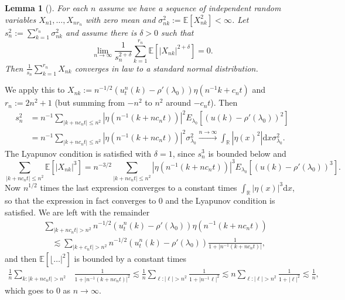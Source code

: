 \documentclass[11pt, a4paper]{article}
\newcommand{\assign}{:=}
\newcommand{\mathd}{\mathrm{d}}
\newcommand{\nocomma}{}
\newtheorem{lemma}[theorem]{Lemma}
\newcommand{\R}{\mathbb{R}}
\newcommand{\1}{\mathbf{1}}
\begin{document}
\begin{lemma}[{\cite[Theorem 27.3]{bib:billingsley}}]
  For each $n$ assume we have a sequence of independent random variables $X_{n
  1}, \ldots, X_{n r_n}$ with zero mean and $\sigma^2_{n k} \assign
  \mathbb{E} [X^2_{n k}] < \infty$. Let $s_n^2 \assign \sum_{k = 1}^{r_n}
  \sigma^2_{n k}$ and assume there is $\delta > 0$ such that
  \[ \lim_{n \rightarrow \infty} \frac{1}{s_n^{2 + \delta}} \sum_{k = 1}^{r_n}
     \mathbb{E} [| X^{}_{n k} |^{2 + \delta}] = 0. \]
  Then $\frac{1}{s_n} \sum_{k = 1}^{r_n} X_{n k}$ converges in law to a
  standard normal distribution.
\end{lemma}
%
We apply this to $X_{n k} \assign n^{- 1 / 2} (u^n_t (k) - \rho' (\lambda_0))
\eta (n^{- 1} k + c_n t)$ and $r_n \assign 2 n^2 + 1$ (but summing from $- n^2$
to $n^2$ around $- c_n t$). Then
\begin{align*}
   s_n^2 & = n^{- 1} \sum_{| k + n c_n t | \leqslant n^2} | \eta (n^{- 1} (k + n
   c_n t)) |^2 E_{\lambda_0} [(u (k) - \rho' (\lambda_0))^2] \\
   & = n^{- 1} \sum_{| k + n c_n t | \leqslant n^2} | \eta (n^{- 1} (k + n c_n t)) |^2 \sigma^2_{\lambda_0} \xrightarrow{n \rightarrow \infty}  \int_\R |\eta (x)^2| \mathd x \sigma^2_{\lambda_0}.
\end{align*}
The Lyapunov condition is satisfied with $\delta = 1$, since $s^3_n$ is
bounded below and
\[ \sum_{| k + n c_n t | \leqslant n^2}^{} \mathbb{E} [| X^{}_{n k} |^{3}] = n^{- 3 / 2} \sum_{| k + n c_n t | \leqslant n^2} | \eta (n^{- 1}
   (k + n c_n t)) |^3 E_{\lambda_0} [(u (k) - \rho' (\lambda_0))^3] . \]
Now $n^{1 / 2}$ times the last expression converges to a constant times
$\int_{\R} |\eta (x)|^3 \mathd x$, so that the expression in fact converges to $0$
and the Lyapunov condition is satisfied.
We are left with the remainder
\begin{align*}
 &\sum_{| k + n c_n t | > n^2} n^{- 1 / 2} (u^n_t (k) - \rho' (\lambda_0))
 \eta (n^{- 1} (k + n c_n t)) \\
 &\quad \lesssim  \sum_{| k + c_n t | > n^2} n^{- 1 / 2} (u^n_t (k) - \rho'
 (\lambda_0)) \frac{1}{1 + | n^{- 1} (k + n c_n t) |},
\end{align*}
and then $\mathbb{E} [\lfloor \ldots |^2]$ is bounded by a constant times
\begin{align*}
 \frac1{n} \sum_{k : | k + n c_n t | > n^2} & \frac{1}{1 + | n^{- 1} (k + n c_n
 t) |^2}
 \lesssim \frac1{n} \sum_{\ell : | \ell | > n^2} \frac{1}{1 + | n^{- 1} \ell
 |^2} %
 \lesssim n \sum_{\ell : | \ell | > n^2} \frac{1}{1 + | \ell |^2} \lesssim \frac1{n},
\end{align*}
which goes to $0$ as $n \rightarrow \infty \nocomma$.
\end{document}
